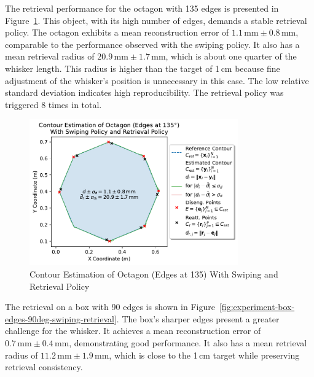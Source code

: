The retrieval performance for the octagon with 135\degree{} edges is presented in Figure~\ref{fig:experiment-octagon-edges-135deg-swiping-retrieval}.
This object, with its high number of edges, demands a stable retrieval policy.
The octagon exhibits a mean reconstruction error of $1.1\,\text{mm} \pm 0.8\,\text{mm}$, comparable to the performance observed with the swiping policy.
It also has a mean retrieval radius of $20.9\,\text{mm} \pm 1.7\,\text{mm}$, which is about one quarter of the whisker length.
This radius is higher than the target of 1\,cm because fine adjustment of the whisker's position is unnecessary in this case.
The low relative standard deviation indicates high reproducibility.
The retrieval policy was triggered 8 times in total.

\begin{figure}[!htb]
    \centering
    \includegraphics[width=0.8\textwidth]{figures/experiments/octagon-edges-135deg-swiping-retrieval}
    \caption{Contour Estimation of Octagon (Edges at 135\degree{}) With Swiping and Retrieval Policy}
    \label{fig:experiment-octagon-edges-135deg-swiping-retrieval}
\end{figure}

The retrieval on a box with 90\degree{} edges is shown in Figure~\ref{fig:experiment-box-edges-90deg-swiping-retrieval}.
The box’s sharper edges present a greater challenge for the whisker.
It achieves a mean reconstruction error of $0.7\,\text{mm} \pm 0.4\,\text{mm}$, demonstrating good performance.
It also has a mean retrieval radius of $11.2\,\text{mm} \pm 1.9\,\text{mm}$, which is close to the 1\,cm target while preserving retrieval consistency.

